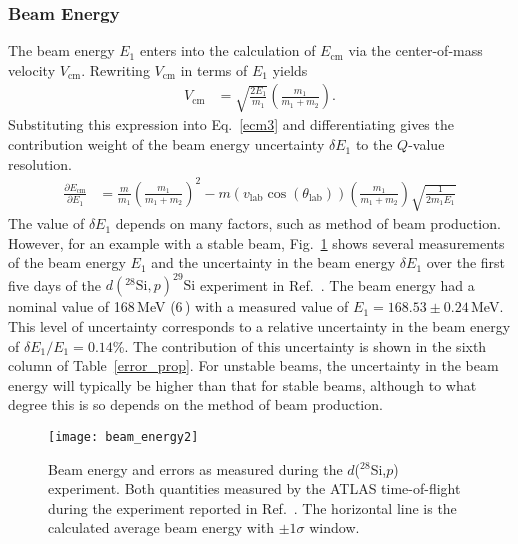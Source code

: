 \subsubsection{Beam Energy}
The beam energy $E_1$ enters into the calculation of $E_\mathrm{cm}$ via the center-of-mass velocity $V_\mathrm{cm}$.  Rewriting $V_\mathrm{cm}$ in terms of $E_1$ yields
\begin{equation}
\begin{split}
V_\mathrm{cm}&=\sqrt{\frac{2E_1}{m_1}}\left(\frac{m_1}{m_1+m_2}\right).
\end{split}
\label{vcm2}
\end{equation}
Substituting this expression into Eq.~\ref{ecm3} and differentiating gives the contribution weight of the beam energy uncertainty $\delta E_1$ to the $Q$-value resolution.
\begin{equation}
\begin{split}
\frac{\partial E_\mathrm{cm}}{\partial E_1}&=\frac{m}{m_1}\left(\frac{m_1}{m_1+m_2}\right)^2-m(v_\mathrm{lab} \cos(\theta_\mathrm{lab}))\left(\frac{m_1}{m_1+m_2}\right)\sqrt{\frac{1}{2m_1E_1}}
\end{split}
\label{eq:delta_vcm}
\end{equation}
The value of $\delta E_1$ depends on many factors, such as method of beam production.  However, for an example with a stable beam, Fig.~\ref{beam_energy} shows  several measurements of the beam energy $E_1$ and the uncertainty in the beam energy $\delta E_1$ over the first five days of the  $d(^{28}\textrm{Si},p)^{29}\textrm{Si}$ experiment in Ref.~\cite{Lighthall_2010}.
The beam energy had a nominal value of 168\,MeV (6\,\AMeV) with a measured value of $E_1=168.53 \pm 0.24$\,MeV. %
  This level of uncertainty corresponds to a relative uncertainty in the beam energy of $\delta E_1/E_1=0.14$\%.  The contribution of this uncertainty is shown in the sixth column of Table~\ref{error_prop}.  For unstable beams, the uncertainty in the beam energy will typically be higher than that for stable beams, although to what degree this is so depends on the method of beam production.

\begin{figure}[t]
\texttt{[image: beam\_energy2]}%
\caption[Beam energy and errors as measured during the $d$($^{28}$Si,$p$) experiment]{Beam energy and errors as measured during the $d$($^{28}$Si,$p$) experiment.  Both quantities measured by the ATLAS time-of-flight during the experiment reported in Ref.~\cite{Lighthall_2010}.  The horizontal line is the calculated average beam energy with $\pm 1 \sigma$ window.}%
\label{beam_energy}%
\end{figure}

